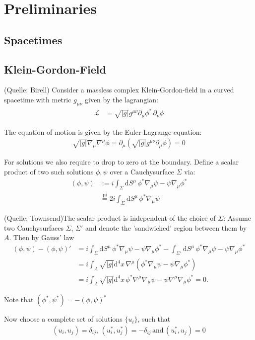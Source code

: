 \chapter{Preliminaries}
\section{Spacetimes}

\section{Klein-Gordon-Field}
(Quelle: Birell)
Consider a massless complex Klein-Gordon-field in a curved spacetime with metric \(g_{\mu\nu}\) given by the lagrangian:
\begin{align*}
\mathcal{L} &= \sqrt{|g|} g^{\mu\nu} \partial_\mu \phi^*\,\partial_\nu \phi 
\end{align*}

The equation of motion is given by the Euler-Lagrange-equation:
\begin{align*}
\sqrt{|g|}\nabla_\mu\nabla^\mu \phi = \partial_\mu \left(\sqrt{|g|} g^{\mu\nu} \partial_\mu \phi\right) = 0
\end{align*}

For solutions we also require to drop to zero at the boundary. Define a scalar product of two such solutions $\phi, \psi$ over a Cauchysurface \(\Sigma\) via:
\begin{align*}
(\phi,\psi) &:= i \int_{\Sigma} \mathrm{d}S^\mu\, \phi^*\nabla_\mu \psi - \psi\nabla_\mu \phi^*\\
	&\overset{\mathrm{pi}}{=}  2i\int_{\Sigma}\mathrm{d}S^\mu\, \phi^*\nabla_\mu \psi
\end{align*}

(Quelle: Townsend)The scalar product is independent of the choice of \(\Sigma\): Assume two Cauchysurfaces \(\Sigma\), \(\Sigma'\) and denote the 'sandwiched' region between them by \(A\). Then by Gauss' law
\begin{align*}
(\phi,\psi) - (\phi,\psi)' &= i\int_{\Sigma}\mathrm{d}S^\mu\, \phi^*\nabla_\mu \psi - \psi\nabla_\mu \phi^* - \int_{\Sigma'}\mathrm{d}S^\mu\, \phi^*\nabla_\mu \psi - \psi\nabla_\mu \phi^*\\
	&= i\int_{A} \sqrt{|g|} \mathrm{d^4}x\,\nabla^\mu \left(\phi^*\nabla_\mu \psi - \psi\nabla_\mu \phi^*\right)\\
	&= i\int_{A} \sqrt{|g|} \mathrm{d^4}x\,\phi^*\nabla^\mu\nabla_\mu \psi - \psi \nabla^\mu\nabla_\mu\phi^* = 0.
\end{align*}

Note that \((\phi^*,\psi^*) = -(\phi,\psi)^*\)

Now choose a complete set of solutions $\{u_i\}$, such that
\begin{align*}
(u_i, u_j) = \delta_{ij},\,(u_i^*, u_j^*) = -\delta_{ij}\,\text{and}\,(u_i^*, u_j) = 0
\end{align*}

